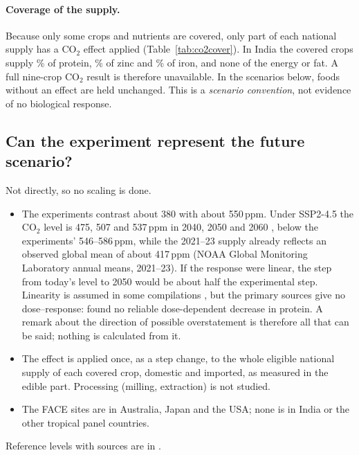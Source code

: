 \paragraph{Coverage of the supply.} Because only some crops and nutrients are covered, only part of each national
supply has a CO$_2$ effect applied (Table~\ref{tab:co2cover}). In India the covered crops supply \cotwoIndCovProtein\% of
protein, \cotwoIndCovZinc\% of zinc and \cotwoIndCovIron\% of iron, and none of the energy or fat. A full nine-crop CO$_2$
result is therefore unavailable. In the scenarios below, foods without an effect are held unchanged. This is a
\emph{scenario convention}, not evidence of no biological response.

\begin{table}[H]\centering\small
\caption[Supply covered by CO$_2$ effects]{Share of national supply to which a CO$_2$ effect is applied (left), and share
supplied by study-crop foods for which no effect could be estimated, the nutrient having no evidence for that crop (right).
Percent of the national total of the nutrient, 2021--23.}\label{tab:co2cover}
\end{table}

\subsection{Can the experiment represent the future scenario?}
Not directly, so no scaling is done.
\begin{itemize}
\item The experiments contrast about 380 with about 550\,ppm. Under SSP2-4.5 the CO$_2$ level is 475, 507 and
537\,ppm in 2040, 2050 and 2060 \citep{ipcc2021annex3,meinshausen2020}, below the experiments' 546--586\,ppm, while the
2021--23 supply already reflects an observed global mean of about 417\,ppm (NOAA Global Monitoring Laboratory annual means, 2021--23). If the response were linear, the step from
today's level to 2050 would be about half the experimental step. Linearity is assumed in some compilations
\citep{terhaar2025}, but the primary sources give no dose--response: \citet{medek2017} found no reliable
dose-dependent decrease in protein. A remark about the direction of possible overstatement is therefore all that can be
said; nothing is calculated from it.
\item The effect is applied once, as a step change, to the whole eligible national supply of each covered crop,
domestic and imported, as measured in the edible part. Processing (milling, extraction) is not studied.
\item The FACE sites are in Australia, Japan and the USA; none is in India or the other tropical panel countries.
\end{itemize}
Reference levels with sources are in .

